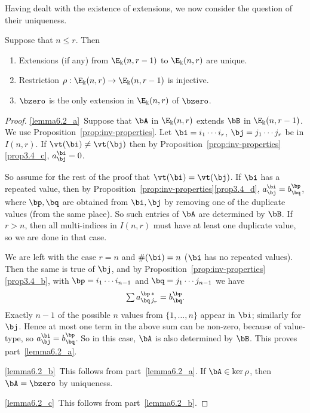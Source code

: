 Having dealt with the existence of extensions, we now consider the
question of their uniqueness.

\begin{lemm}\label{lem:rho-injects}
 Suppose that $n \le r$. Then
 \begin{enumerate}[label=(\alph*)]
 \item\label{lemma6.2_a} Extensions \textup{(}if any\textup{)} from $\E_\Bbbk(n,r-1)$
 to $\E_\Bbbk(n,r)$ are unique.
 \item\label{lemma6.2_b} Restriction $\rho: \E_\Bbbk(n,r) \to \E_\Bbbk(n,r-1)$ is
 injective.
 \item\label{lemma6.2_c} $\bzero$ is the only extension in $\E_\Bbbk(n,r)$ of $\bzero$.
 \end{enumerate}
\end{lemm}

\begin{proof}
\ref{lemma6.2_a}~Suppose that $\bA$ in $\E_\Bbbk(n,r)$ extends $\bB$ in
 $\E_\Bbbk(n,r-1)$. We use Proposition~\ref{prop:inv-properties}. Let
 $\bi = i_1 \cdots i_r$, $\bj = j_1 \cdots j_r$ be in $I(n,r)$. If
 $\vt(\bi) \ne \vt(\bj)$ then by Proposition~\ref{prop:inv-properties}\ref{prop3.4_c}, $a^\bi_\bj = 0$.

\goodbreak
 So assume for the rest of the proof that $\vt(\bi) = \vt(\bj)$. If
 $\bi$ has a repeated value, then by Proposition~\ref{prop:inv-properties}\ref{prop3.4_d}, $a^\bi_\bj = b^\bp_\bq$, where $\bp,
 \bq$ are obtained from $\bi, \bj$ by removing one of the duplicate
 values (from the same place). So such entries of $\bA$ are
 determined by $\bB$. If $r>n$, then all multi-indices in $I(n,r)$
 must have at least one duplicate value, so we are done in that case.

 We are left with the case $r=n$ and $\#(\bi) = n$ ($\bi$ has no
 repeated values). Then the same is true of $\bj$, and by Proposition~\ref{prop:inv-properties}\ref{prop3.4_b}, with $\bp = i_1 \cdots i_{n-1}$ and
 $\bq = j_1 \cdots j_{n-1}$ we have
 \[
 \textstyle \sum a^{\bp\,*}_{\bq\,j_r} = b^\bp_\bq .
 \]
 Exactly $n-1$ of the possible $n$ values from $\{1, \dots, n\}$
 appear in $\bi$; similarly for $\bj$. Hence at most one term in the
 above sum can be non-zero, because of value-type, so $a^\bi_\bj =
 b^\bp_\bq$. So in this case, $\bA$ is also determined by $\bB$. This
 proves part~\ref{lemma6.2_a}.

\ref{lemma6.2_b}~This follows from part~\ref{lemma6.2_a}. If $\bA \in \ker \rho$, then $\bA =
 \bzero$ by uniqueness.

\ref{lemma6.2_c}~This follows from part~\ref{lemma6.2_b}.
\end{proof}

